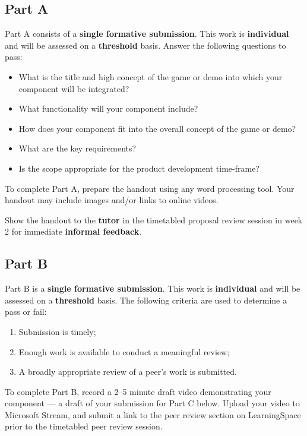\documentclass{../../fal_assignment}
\begin{document}
\subsection*{Part A}

Part A consists of a \textbf{single formative submission}. This work is \textbf{individual} and will be assessed on a \textbf{threshold} basis. Answer the following questions to pass:

\begin{itemize}
	\item What is the title and high concept of the game or demo into which your component will be integrated?
	\item What functionality will your component include?
	\item How does your component fit into the overall concept of the game or demo?
	\item What are the key requirements?
	\item Is the scope appropriate for the product development time-frame?
\end{itemize}

To complete Part A, prepare the handout using any word processing tool.
Your handout may include images and/or links to online videos.

Show the handout to the \textbf{tutor} in the timetabled proposal review session in week 2 for immediate \textbf{informal feedback}.

\subsection*{Part B}

Part B is a \textbf{single formative submission}. This work is \textbf{individual} and will be assessed on a \textbf{threshold} basis. The following criteria are used to determine a pass or fail:

\begin{enumerate}[label=(\alph*)]
	\item Submission is timely;
	\item Enough work is available to conduct a meaningful review;
	\item A broadly appropriate review of a peer's work is submitted.
\end{enumerate}

To complete Part B, record a 2--5 minute draft video demonstrating your component --- a draft of your submission for Part C below.
Upload your video to Microsoft Stream, and submit a link to the peer review section on LearningSpace prior to the timetabled peer review session.
\end{document}
